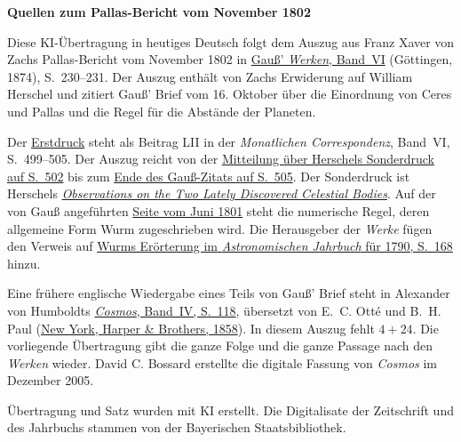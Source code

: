 \clearpage\thispagestyle{empty}
\begin{center}\textbf{Quellen zum Pallas-Bericht vom November 1802}\end{center}
\noindent Diese KI-Übertragung in heutiges Deutsch folgt dem Auszug aus Franz Xaver von Zachs Pallas-Bericht vom November 1802 in \href{https://gdz.sub.uni-goettingen.de/id/PPN236007467}{Gauß’ \textit{Werken}, Band~VI} (Göttingen, 1874), S.~230--231. Der Auszug enthält von Zachs Erwiderung auf William Herschel und zitiert Gauß’ Brief vom 16. Oktober über die Einordnung von Ceres und Pallas und die Regel für die Abstände der Planeten.
\par\smallskip\noindent Der \href{https://api.digitale-sammlungen.de/iiif/image/v2/bsb10538598_00513/full/1450,/0/default.jpg}{Erstdruck} steht als Beitrag LII in der \textit{Monatlichen Correspondenz}, Band~VI, S.~499--505. Der Auszug reicht von der \href{https://api.digitale-sammlungen.de/iiif/image/v2/bsb10538598_00516/full/1450,/0/default.jpg}{Mitteilung über Herschels Sonderdruck auf S.~502} bis zum \href{https://api.digitale-sammlungen.de/iiif/image/v2/bsb10538598_00519/full/1450,/0/default.jpg}{Ende des Gauß-Zitats auf S.~505}. Der Sonderdruck ist Herschels \href{https://doi.org/10.1098/rstl.1802.0010}{\textit{Observations on the Two Lately Discovered Celestial Bodies}}. Auf der von Gauß angeführten \href{https://api.digitale-sammlungen.de/iiif/image/v2/bsb10538595_00604/full/1450,/0/default.jpg}{Seite vom Juni 1801} steht die numerische Regel, deren allgemeine Form Wurm zugeschrieben wird. Die Herausgeber der \textit{Werke} fügen den Verweis auf \href{https://api.digitale-sammlungen.de/iiif/image/v2/bsb10538319_00180/full/1450,/0/default.jpg}{Wurms Erörterung im \textit{Astronomischen Jahrbuch} für 1790, S.~168} hinzu.
\par\smallskip\noindent Eine frühere englische Wiedergabe eines Teils von Gauß’ Brief steht in Alexander von Humboldts \href{https://www.geology.19thcenturyscience.org/books/1858-Humboldt-Cosmos/Vol-IV/PDFpages/1858-Humboldt-Cosmos-IV-0118.pdf}{\textit{Cosmos}, Band~IV, S.~118}, übersetzt von E.~C. Otté und B.~H. Paul (\href{https://www.geology.19thcenturyscience.org/books/1858-Humboldt-Cosmos/Vol-IV/PDFpages/1858-Humboldt-Cosmos-IV-0002.pdf}{New York, Harper \& Brothers, 1858}). In diesem Auszug fehlt \(4+24\). Die vorliegende Übertragung gibt die ganze Folge und die ganze Passage nach den \textit{Werken} wieder. David C. Bossard erstellte die digitale Fassung von \textit{Cosmos} im Dezember 2005.
\par\smallskip\noindent Übertragung und Satz wurden mit KI erstellt. Die Digitalisate der Zeitschrift und des Jahrbuchs stammen von der Bayerischen Staatsbibliothek.
\clearpage
